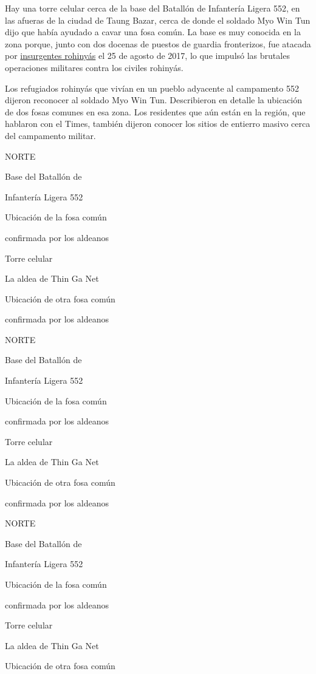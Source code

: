 Hay una torre celular cerca de la base del Batallón de Infantería Ligera
552, en las afueras de la ciudad de Taung Bazar, cerca de donde el
soldado Myo Win Tun dijo que había ayudado a cavar una fosa común. La
base es muy conocida en la zona porque, junto con dos docenas de puestos
de guardia fronterizos, fue atacada por
\href{https://www.nytimes3xbfgragh.onion/es/2017/09/28/espanol/como-la-violencia-en-birmania-radicalizo-a-una-nueva-generacion-rohinya.html}{insurgentes
rohinyás} el 25 de agosto de 2017, lo que impulsó las brutales
operaciones militares contra los civiles rohinyás.

Los refugiados rohinyás que vivían en un pueblo adyacente al campamento
552 dijeron reconocer al soldado Myo Win Tun. Describieron en detalle la
ubicación de dos fosas comunes en esa zona. Los residentes que aún están
en la región, que hablaron con el Times, también dijeron conocer los
sitios de entierro masivo cerca del campamento militar.

NORTE

Base del Batallón de

Infantería Ligera 552

Ubicación de la fosa común

confirmada por los aldeanos

Torre celular

La aldea de Thin Ga Net

Ubicación de otra fosa común

confirmada por los aldeanos

NORTE

Base del Batallón de

Infantería Ligera 552

Ubicación de la fosa común

confirmada por los aldeanos

Torre celular

La aldea de Thin Ga Net

Ubicación de otra fosa común

confirmada por los aldeanos

NORTE

Base del Batallón de

Infantería Ligera 552

Ubicación de la fosa común

confirmada por los aldeanos

Torre celular

La aldea de Thin Ga Net

Ubicación de otra fosa común

